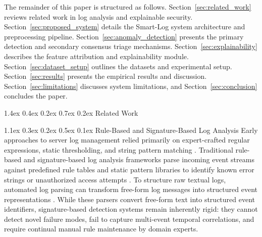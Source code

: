 \documentclass[10pt,conference]{IEEEtran}
\makeatletter
\renewcommand\section{\@startsection{section}{1}{\z@}%
  {1.4ex \@plus 0.4ex \@minus 0.2ex}%
  {0.7ex \@plus 0.2ex}%
  {\normalfont\fontsize{12pt}{14.4pt}\selectfont\bfseries\centering}}
\renewcommand\subsection{\@startsection{subsection}{2}{\z@}%
  {1.1ex \@plus 0.3ex \@minus 0.2ex}%
  {0.5ex \@plus 0.1ex}%
  {\normalfont\fontsize{12pt}{14.4pt}\selectfont\bfseries}}
\makeatother
\begin{document}
The remainder of this paper is structured as follows. Section~\ref{sec:related_work} reviews related work in log analysis and explainable security. Section~\ref{sec:proposed_system} details the Smart-Log system architecture and preprocessing pipeline. Section~\ref{sec:anomaly_detection} presents the primary detection and secondary consensus triage mechanisms. Section~\ref{sec:explainability} describes the feature attribution and explainability module. Section~\ref{sec:dataset_setup} outlines the datasets and experimental setup. Section~\ref{sec:results} presents the empirical results and discussion. Section~\ref{sec:limitations} discusses system limitations, and Section~\ref{sec:conclusion} concludes the paper.

\section{Related Work}
\label{sec:related_work}

\subsection{Rule-Based and Signature-Based Log Analysis}
Early approaches to server log management relied primarily on expert-crafted regular expressions, static thresholding, and string pattern matching \cite{b7}. Traditional rule-based and signature-based log analysis frameworks parse incoming event streams against predefined rule tables and static pattern libraries to identify known error strings or unauthorized access attempts \cite{b7}. To structure raw textual logs, automated log parsing can transform free-form log messages into structured event representations \cite{b13, b15}. While these parsers convert free-form text into structured event identifiers, signature-based detection systems remain inherently rigid: they cannot detect novel failure modes, fail to capture multi-event temporal correlations, and require continual manual rule maintenance by domain experts.
\end{document}

